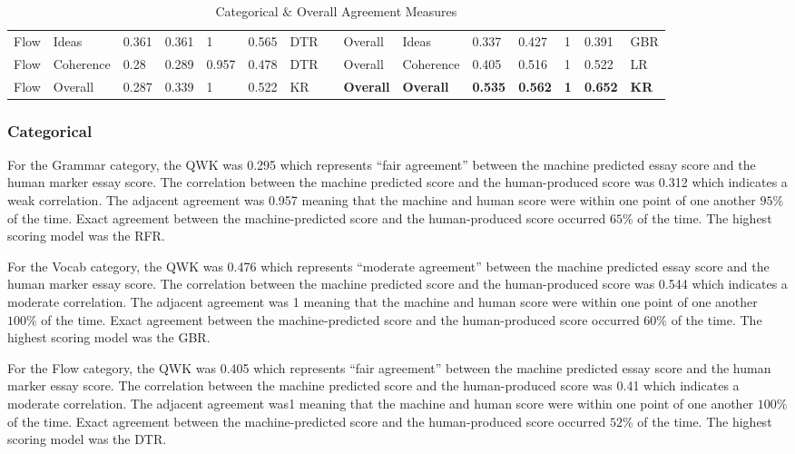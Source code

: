 \begin{table}[h]
{\begin{tabular}{@{}lllllllllllllll@{}}
Flow &
  Ideas &
  0.361 &
  0.361 &
  1 &
  0.565 &
  DTR &
  &
  Overall &
  Ideas &
  0.337 &
  0.427 &
  1 &
  0.391 &
  GBR \\
Flow &
  Coherence &
  0.28 &
  0.289 &
  0.957 &
  0.478 &
  DTR &
  &
  Overall &
  Coherence &
  0.405 &
  0.516 &
  1 &
  0.522 &
  LR \\
Flow &
  Overall &
  0.287 &
  0.339 &
  1 &
  0.522 &
  KR &
  &
  \cellcolor[HTML]{EFEFEF}\textbf{Overall} &
  \cellcolor[HTML]{EFEFEF}\textbf{Overall} &
  \cellcolor[HTML]{EFEFEF}\textbf{0.535} &
  \cellcolor[HTML]{EFEFEF}\textbf{0.562} &
  \cellcolor[HTML]{EFEFEF}\textbf{1} &
  \cellcolor[HTML]{EFEFEF}\textbf{0.652} &
  \cellcolor[HTML]{EFEFEF}\textbf{KR} \\ \bottomrule
\end{tabular}%
}
\caption{Categorical $\&$ Overall Agreement Measures}
\end{table}

\subsubsection{Categorical}

For the Grammar category, the QWK was 0.295 which represents “fair agreement” between the machine predicted essay score and the human marker essay score. The correlation between the machine predicted score and the human-produced score was 0.312 which indicates a weak correlation. The adjacent agreement was 0.957 meaning that the machine and human score were within one point of one another $95\%$ of the time. Exact agreement between the machine-predicted score and the human-produced score occurred $65\%$ of the time. The highest scoring model was the RFR.

For the Vocab category, the QWK was 0.476 which represents “moderate agreement” between the machine predicted essay score and the human marker essay score. The correlation between the machine predicted score and the human-produced score was 0.544 which indicates a moderate correlation. The adjacent agreement was 1 meaning that the machine and human score were within one point of one another $100\%$ of the time. Exact agreement between the machine-predicted score and the human-produced score occurred $60\%$ of the time. The highest scoring model was the GBR.

For the Flow category, the QWK was 0.405 which represents “fair agreement” between the machine predicted essay score and the human marker essay score. The correlation between the machine predicted score and the human-produced score was 0.41 which indicates a moderate correlation. The adjacent agreement was1 meaning that the machine and human score were within one point of one another $100\%$ of the time. Exact agreement between the machine-predicted score and the human-produced score occurred $52\%$ of the time. The highest scoring model was the DTR.

